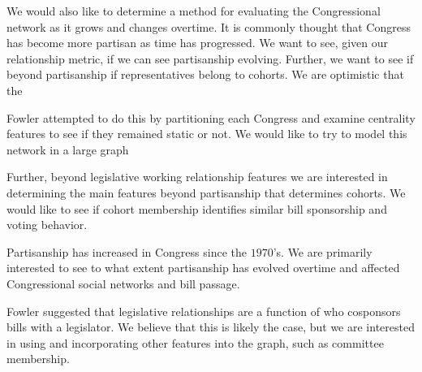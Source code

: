 We would also like to determine a method for evaluating the Congressional
network as it grows and changes overtime. It is commonly thought that Congress
has become more partisan as time has progressed. We want to see, given our
relationship metric, if we can see partisanship evolving. Further, we want to
see if beyond partisanship if representatives belong to cohorts. We are 
optimistic that the

Fowler attempted to do this by  partitioning each Congress and examine
centrality features to see if they  remained static or not. We would like to try
to model this network in a  large graph

Further, beyond legislative working relationship features we are interested in 
determining the main features beyond partisanship that determines cohorts. We 
would like to see if cohort membership identifies similar bill sponsorship and 
voting behavior.

Partisanship has increased in Congress since the $1970$'s. We are primarily 
interested to see to what extent partisanship has evolved overtime and affected 
Congressional social networks and bill passage.

Fowler suggested that legislative relationships are a function  of who
cosponsors bills with a legislator. We believe that this is likely the  case,
but we are interested in using and incorporating other features into  the graph,
such as committee membership. 
